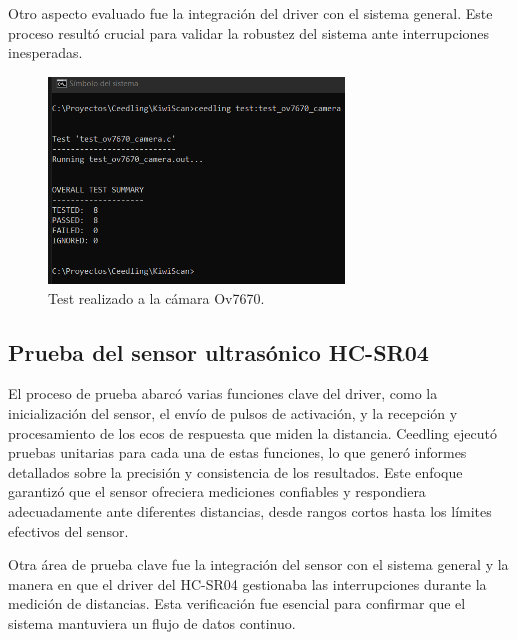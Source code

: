 Otro aspecto evaluado fue la integración del driver con el sistema general. Este proceso resultó crucial para validar la robustez del sistema ante interrupciones inesperadas.

\newpage

\vspace{1cm}

\begin{figure}[htbp]
	\centering
	\includegraphics[width=0.7\textwidth, height=0.3\textheight]{./Figures/test_ov7670_camera.png}
	\caption{Test realizado a la cámara Ov7670.}
	\label{fig:test_ov7670_camera}
\end{figure}

\vspace{1cm}

\subsection{Prueba del sensor ultrasónico HC-SR04}

El proceso de prueba abarcó varias funciones clave del driver, como la inicialización del sensor, el envío de pulsos de activación, y la recepción y procesamiento de los ecos de respuesta que miden la distancia. Ceedling ejecutó pruebas unitarias para cada una de estas funciones, lo que generó informes detallados sobre la precisión y consistencia de los resultados. Este enfoque garantizó que el sensor ofreciera mediciones confiables y respondiera adecuadamente ante diferentes distancias, desde rangos cortos hasta los límites efectivos del sensor.

Otra área de prueba clave fue la integración del sensor con el sistema general y la manera en que el driver del HC-SR04 gestionaba las interrupciones durante la medición de distancias. Esta verificación fue esencial para confirmar que el sistema mantuviera un flujo de datos continuo.

